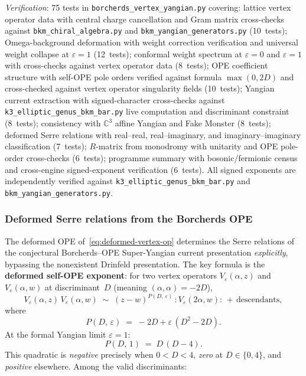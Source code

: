 	\noindent\textit{Verification}: 75 tests in \texttt{borcherds\_vertex\_yangian.py} covering: lattice vertex operator data with central charge cancellation and Gram matrix cross-checks against \texttt{bkm\_chiral\_algebra.py} and \texttt{bkm\_yangian\_generators.py} (10~tests); Omega-background deformation with weight correction verification and universal weight collapse at $\varepsilon = 1$ (12~tests); conformal weight spectrum at $\varepsilon = 0$ and $\varepsilon = 1$ with cross-checks against vertex operator data (8~tests); OPE coefficient structure with self-OPE pole orders verified against formula $\max(0, 2D)$ and cross-checked against vertex operator singularity fields (10~tests); Yangian current extraction with signed-character cross-checks against \texttt{k3\_elliptic\_genus\_bkm\_bar.py} live computation and discriminant constraint (8~tests); consistency with $\mathbb{C}^3$ affine Yangian and Fake Monster (8~tests); deformed Serre relations with real--real, real--imaginary, and imaginary--imaginary classification (7~tests); $R$-matrix from monodromy with unitarity and OPE pole-order cross-checks (6~tests); programme summary with bosonic/fermionic census and cross-engine signed-exponent verification (6~tests). All signed exponents are independently verified against \texttt{k3\_elliptic\_genus\_bkm\_bar.py} and \texttt{bkm\_yangian\_generators.py}.


\subsubsection{Deformed Serre relations from the Borcherds OPE}
\label{subsubsec:k3e-deformed-serre-ope}

The deformed OPE of~\eqref{eq:deformed-vertex-op} determines the Serre relations
of the conjectural Borcherds--OPE Super-Yangian current presentation
\emph{explicitly}, bypassing the nonexistent Drinfeld presentation.
The key formula is the \textbf{deformed self-OPE exponent}: for two
vertex operators $V_\varepsilon(\alpha, z)$ and $V_\varepsilon(\alpha, w)$ at
discriminant~$D$ (meaning $(\alpha, \alpha) = -2D$),
\begin{equation}
\label{eq:deformed-self-ope-exponent}
V_\varepsilon(\alpha, z)\, V_\varepsilon(\alpha, w)
\;\sim\; (z - w)^{P(D,\,\varepsilon)}\, {:}V_\varepsilon(2\alpha, w){:}
\,+\, \text{descendants},
\end{equation}
where
\begin{equation}
\label{eq:P-self-formula}
P(D,\,\varepsilon) \;=\; -2D + \varepsilon\,(D^2 - 2D).
\end{equation}
At the formal Yangian limit $\varepsilon = 1$:
\[
P(D,\, 1) \;=\; D\,(D - 4).
\]
This quadratic is \emph{negative} precisely when $0 < D < 4$, \emph{zero} at $D \in \{0, 4\}$,
and \emph{positive} elsewhere. Among the valid discriminants:

